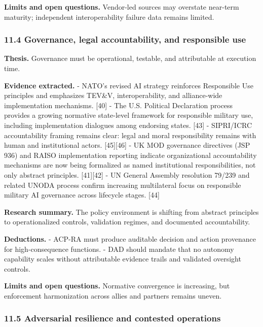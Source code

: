 \documentclass[11pt]{article}
\begin{document}
\textbf{Limits and open questions.} Vendor-led sources may overstate
near-term maturity; independent interoperability failure data remains
limited.

\hypertarget{governance-legal-accountability-and-responsible-use}{%
\subsubsection{11.4 Governance, legal accountability, and responsible
use}\label{governance-legal-accountability-and-responsible-use}}

\textbf{Thesis.} Governance must be operational, testable, and
attributable at execution time.

\textbf{Evidence extracted.} - NATO's revised AI strategy reinforces
Responsible Use principles and emphasizes TEV\&V, interoperability, and
alliance-wide implementation mechanisms. {[}40{]} - The U.S. Political
Declaration process provides a growing normative state-level framework
for responsible military use, including implementation dialogues among
endorsing states. {[}43{]} - SIPRI/ICRC accountability framing remains
clear: legal and moral responsibility remains with human and
institutional actors. {[}45{]}{[}46{]} - UK MOD governance directives
(JSP 936) and RAISO implementation reporting indicate organizational
accountability mechanisms are now being formalized as named
institutional responsibilities, not only abstract principles.
{[}41{]}{[}42{]} - UN General Assembly resolution 79/239 and related
UNODA process confirm increasing multilateral focus on responsible
military AI governance across lifecycle stages. {[}44{]}

\textbf{Research summary.} The policy environment is shifting from
abstract principles to operationalized controls, validation regimes, and
documented accountability.

\textbf{Deductions.} - ACP-RA must produce auditable decision and action
provenance for high-consequence functions. - DAD should mandate that no
autonomy capability scales without attributable evidence trails and
validated oversight controls.

\textbf{Limits and open questions.} Normative convergence is increasing,
but enforcement harmonization across allies and partners remains uneven.

\hypertarget{adversarial-resilience-and-contested-operations}{%
\subsubsection{11.5 Adversarial resilience and contested
operations}\label{adversarial-resilience-and-contested-operations}}
\end{document}
